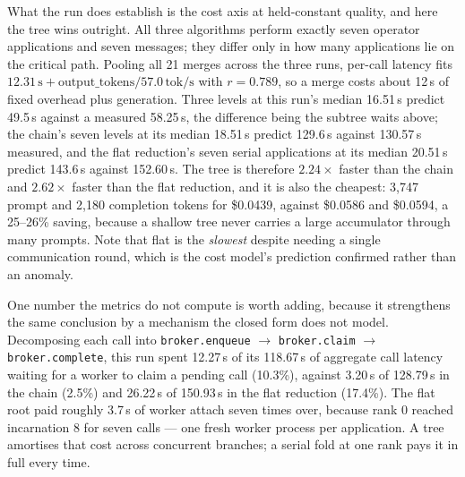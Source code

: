 \documentclass[11pt]{article}
\begin{document}
What the run does establish is the cost axis at held-constant quality, and here the
tree wins outright. All three algorithms perform exactly seven operator applications
and seven messages; they differ only in how many applications lie on the critical path.
Pooling all 21 merges across the three runs, per-call latency fits
$12.31\,\text{s} + \text{output\_tokens} / 57.0\,\text{tok/s}$ with $r = 0.789$, so a
merge costs about 12\,s of fixed overhead plus generation. Three levels at this run's
median 16.51\,s predict 49.5\,s against a measured 58.25\,s, the difference being the
subtree waits above; the chain's seven levels at its median 18.51\,s predict 129.6\,s
against 130.57\,s measured, and the flat reduction's seven serial applications at its
median 20.51\,s predict 143.6\,s against 152.60\,s. The tree is therefore
$2.24\times$ faster than the chain and $2.62\times$ faster than the flat reduction, and
it is also the cheapest: 3{,}747 prompt and 2{,}180 completion tokens for \$0.0439,
against \$0.0586 and \$0.0594, a 25--26\% saving, because a shallow tree never carries a
large accumulator through many prompts. Note that flat is the \emph{slowest} despite
needing a single communication round, which is the cost model's prediction confirmed
rather than an anomaly.

One number the metrics do not compute is worth adding, because it strengthens the same
conclusion by a mechanism the closed form does not model. Decomposing each call into
\texttt{broker.enqueue} $\to$ \texttt{broker.claim} $\to$ \texttt{broker.complete},
this run spent 12.27\,s of its 118.67\,s of aggregate call latency waiting for a worker
to claim a pending call (10.3\%), against 3.20\,s of 128.79\,s in the chain (2.5\%) and
26.22\,s of 150.93\,s in the flat reduction (17.4\%). The flat root paid roughly 3.7\,s
of worker attach seven times over, because rank 0 reached incarnation 8 for seven calls
--- one fresh worker process per application. A tree amortises that cost across
concurrent branches; a serial fold at one rank pays it in full every time.
\end{document}
